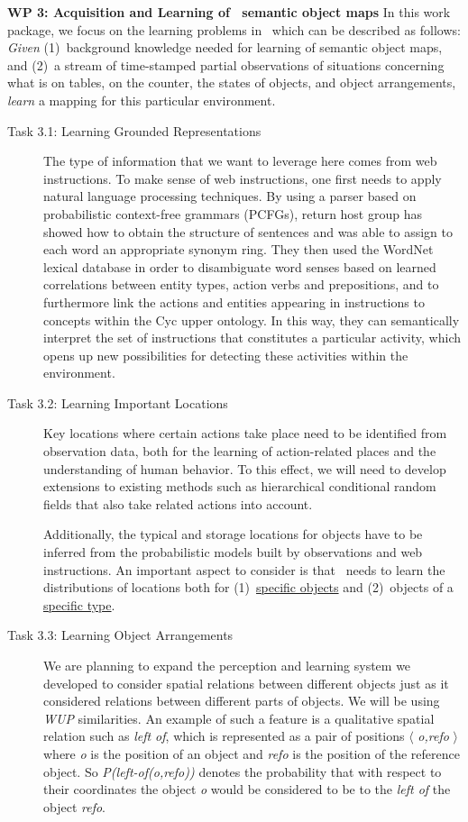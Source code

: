 \textbf{WP 3: Acquisition and Learning of \ksem\ semantic object maps}
In this work package, we focus on the learning problems in 
\ksem\ which can be described as follows: \emph{Given} (1)~background
knowledge needed for learning of semantic object maps,  and (2)~a stream
of time-stamped partial observations of situations concerning what is
on tables, on the counter, the states of objects, and object
arrangements, \emph{learn} a mapping for this particular environment.
\begin{description}
\item[Task 3.1: Learning Grounded Representations] The
  type of information that we want to leverage here comes from web instructions.
  To make sense of web instructions, one first needs to apply natural language
  processing techniques. By using a parser based on probabilistic
  context-free grammars (PCFGs),
  return host group has showed how to obtain the structure of sentences and was able to assign to each word an appropriate synonym ring.
  They then used the WordNet lexical database in order to disambiguate word senses based on learned
  correlations between entity types, action verbs and prepositions, and to furthermore
  link the actions and entities appearing in instructions to concepts within the Cyc
  upper ontology. In this way, they can semantically interpret the set of instructions that
  constitutes a particular activity, which opens up 
  new possibilities for detecting these activities within the environment.

\item[Task 3.2: Learning Important Locations] 
  Key locations where certain actions take place need to be identified from
  observation data, both for the learning of action-related places
  and the understanding of human behavior. To this effect, we will need to develop extensions
  to existing methods such as hierarchical conditional random fields
  that also take related actions into account.

  Additionally, the typical and storage locations for objects have to
  be inferred from the probabilistic models built by observations and
  web instructions.
  An important aspect to consider is that \ksem\ needs to learn the distributions
  of locations both for (1)~\underline{specific objects} and (2)~objects of a
  \underline{specific type}.

\item[Task 3.3: Learning Object Arrangements]
  We are planning to expand the perception and learning system we developed
  to consider spatial relations between different objects just as it considered relations between
  different parts of objects. We will be using \emph{WUP} similarities.
  An example of such a feature is a qualitative spatial relation
  such as \emph{left of}, which is represented as a 
  pair of positions $\langle$ \emph{o,refo} $\rangle$ where
  \emph{o} is the position of an object and
  \emph{refo} is the position of the reference object. So
  \emph{P(left-of(o,refo))} denotes the probability that with
  respect to their coordinates the object \emph{o} would be
  considered to be to the \emph{left of} the object \emph{refo}.


\end{description}
